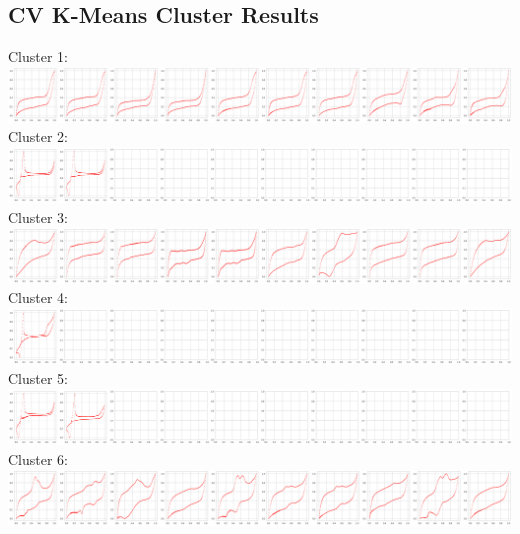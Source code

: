 \appendix 
\makeatletter
{}
\makeatother
\renewcommand{\thechapter}{\Alph{chapter}}
\label{appendix}
\chapter{}

\section{CV K-Means Cluster Results}
Cluster 1:\\
\includegraphics[width=1.0\textwidth]{figures/clusters/cv_cluster1.png}
Cluster 2:\\
\includegraphics[width=1.0\textwidth]{figures/clusters/cv_cluster2.png}
Cluster 3:\\
\includegraphics[width=1.0\textwidth]{figures/clusters/cv_cluster3.png}
Cluster 4:\\
\includegraphics[width=1.0\textwidth]{figures/clusters/cv_cluster4.png}
Cluster 5:\\
\includegraphics[width=1.0\textwidth]{figures/clusters/cv_cluster5.png}
Cluster 6:\\
\includegraphics[width=1.0\textwidth]{figures/clusters/cv_cluster6.png}
